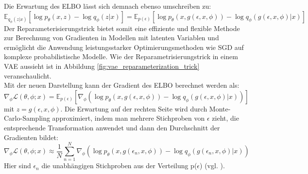 \documentclass[%
thesis=student,%
coverpage=false,%
titlepage=false,%
headmarks=true, %
german,%
font=libertine, %
math=newpxtx, %
BCOR=5mm,%
coverBCOR=11mm%
]{tumbook}
\theoremstyle{break}
\begin{document}
Die Erwartung des ELBO lässt sich demnach ebenso umschreiben zu: 
$$  \mathbb{E}_{q_\phi(z|x)}\left[\log p_\theta(x,z)- \log q_\phi(z|x)\right] =  \mathbb{E}_{p(\epsilon)}\left[\log p_\theta(x,g(\epsilon,x, \phi))- \log q_\phi(g(\epsilon,x, \phi)|x)\right] $$
Der Reparameterisierungstrick bietet somit eine effiziente und flexible Methode zur Berechnung von Gradienten in Modellen mit latenten Variablen und ermöglicht die Anwendung leistungsstarker Optimierungsmethoden wie SGD auf komplexe probabilistische Modelle. Wie der Reparametrisierungstrick in einem VAE aussieht ist in  Abbildung \ref{fig:vae_reparameterization_trick} veranschaulicht.
\\
Mit der neuen Darstellung kann der Gradient des ELBO berechnet werden als:
$$	\nabla_\phi \mathcal{L}(\theta,\phi;x) =
 \mathbb{E}_{p(\epsilon)}\left[\nabla_\phi(\log p_\theta(x,g(\epsilon,x, \phi))- \log q_\phi(g(\epsilon,x, \phi)|x))\right] $$ mit $z = g(\epsilon, x, \phi)$. 
Die Erwartung auf der rechten Seite wird durch Monte-Carlo-Sampling approximiert, indem man mehrere Stichproben von $\epsilon$ zieht, die entsprechende Transformation anwendet und dann den Durchschnitt der Gradienten bildet: 
$$ \nabla_\phi \mathcal{L}(\theta,\phi;x) \approx \frac{1}{N} \sum_{n=1}^{N} \nabla_{\phi} (\log p_\theta(x,g(\epsilon_n,x, \phi))- \log q_\phi(g(\epsilon_n,x, \phi)|x)) $$
Hier sind $\epsilon_n$ die unabhängigen Stichproben aus der Verteilung p($\epsilon$) (vgl. \cite{MonteCarloEstimation}).
\end{document}
